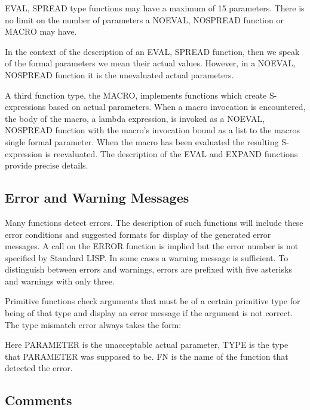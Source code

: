 EVAL, SPREAD type functions may have a maximum of 15 parameters.
There is no limit on the number of parameters a NOEVAL, NOSPREAD
function or MACRO may have.

In the context of the description of an EVAL, SPREAD function, then we
speak of the formal parameters we mean their actual values.  However,
in a NOEVAL, NOSPREAD function it is the unevaluated actual
parameters.

A third function type, the MACRO, implements functions which
create S-expressions based on actual parameters. When a macro
invocation is encountered, the body of the macro, a lambda expression,
is invoked as a NOEVAL, NOSPREAD function with the macro's invocation
bound as a list to the macros single formal parameter. When the macro
has been evaluated the resulting S-expression is reevaluated. The
description of the EVAL and EXPAND
functions provide precise details.


\subsection{Error and Warning Messages}
Many functions detect errors. The description of such functions will
include these error conditions and suggested formats for display
of the generated error messages. A call on the ERROR function is
implied but the error number is not specified by Standard LISP. In
some cases a warning message is sufficient. To distinguish between
 
errors and warnings, errors are prefixed with five asterisks and
warnings with only three.

Primitive functions check arguments that must be of a certain
primitive type for being of that type and display an error message if
the argument is not correct. The type mismatch error always takes the
form:


Here PARAMETER is the unacceptable actual parameter, TYPE is the type
that PARAMETER was supposed to be. FN is the name of the function that
detected the error.

\subsection{Comments}

